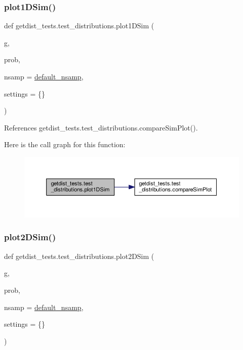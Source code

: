 \subsubsection{\texorpdfstring{plot1\+D\+Sim()}{plot1DSim()}}
{\footnotesize\ttfamily def getdist\+\_\+tests.\+test\+\_\+distributions.\+plot1\+D\+Sim (\begin{DoxyParamCaption}\item[{}]{g,  }\item[{}]{prob,  }\item[{}]{nsamp = {\ttfamily \mbox{\hyperlink{namespacegetdist__tests_1_1test__distributions_af66b4064706bf88e0ed5378ff868fc39}{default\+\_\+nsamp}}},  }\item[{}]{settings = {\ttfamily \{\}} }\end{DoxyParamCaption})}



References getdist\+\_\+tests.\+test\+\_\+distributions.\+compare\+Sim\+Plot().

Here is the call graph for this function\+:
\nopagebreak
\begin{figure}[H]
\begin{center}
\leavevmode
\includegraphics[width=350pt]{namespacegetdist__tests_1_1test__distributions_a3ae94f720e6178acca116decb0f76a8f_cgraph}
\end{center}
\end{figure}
\mbox{\label{namespacegetdist__tests_1_1test__distributions_aef08c01dc3b9daf15ea7f11c2927610e}} 
\subsubsection{\texorpdfstring{plot2\+D\+Sim()}{plot2DSim()}}
{\footnotesize\ttfamily def getdist\+\_\+tests.\+test\+\_\+distributions.\+plot2\+D\+Sim (\begin{DoxyParamCaption}\item[{}]{g,  }\item[{}]{prob,  }\item[{}]{nsamp = {\ttfamily \mbox{\hyperlink{namespacegetdist__tests_1_1test__distributions_af66b4064706bf88e0ed5378ff868fc39}{default\+\_\+nsamp}}},  }\item[{}]{settings = {\ttfamily \{\}} }\end{DoxyParamCaption})}




